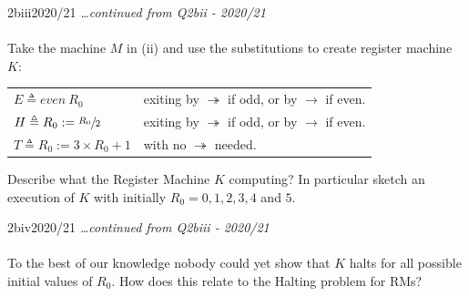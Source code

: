 \begin{exambox}{2biii}{2020/21}
    \textit{\dots continued from Q2bii - 2020/21}
    \\
    \\ Take the machine $M$ in (ii) and use the substitutions to create register machine $K$:
    \begin{center}
        \begin{tabular}{l p{}}
            $E \triangleq even \ R_0$ & exiting by $\twoheadrightarrow$ if odd, or by $\to$ if even. \\
            $H \triangleq R_0 := \sfrac{R_0}{2}$ & exiting by $\twoheadrightarrow$ if odd, or by $\to$ if even. \\
            $T \triangleq R_0 := 3 \times R_0 + 1$ & with no $\twoheadrightarrow$ needed. \\
        \end{tabular}
    \end{center}
    Describe what the Register Machine $K$ computing? In particular sketch an execution of $K$ with initially $R_0 = 0, 1, 2, 3, 4$ and $5$.
\end{exambox}
\begin{exambox}{2biv}{2020/21}
    \textit{\dots continued from Q2biii - 2020/21}
    \\
    \\ To the best of our knowledge nobody could yet show that $K$ halts for all
    possible initial values of $R_0$. How does this relate to the Halting problem
    for RMs?
\end{exambox}
